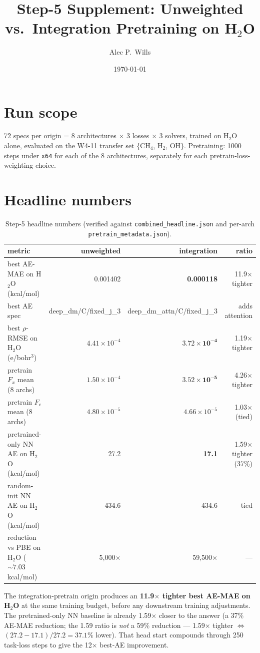 \documentclass[11pt,letterpaper]{article}
\title{Step-5 Supplement: Unweighted vs.\ Integration Pretraining on H$_2$O}
\author{Alec P.\ Wills}
\date{\today}
\begin{document}
\maketitle

\section*{Run scope}
72 specs per origin = 8 architectures $\times$ 3 losses $\times$ 3 solvers,
trained on H$_2$O alone, evaluated on the W4-11 transfer set
$\{$CH$_4$, H$_2$, OH$\}$. Pretraining: 1000 steps under \texttt{x64} for each
of the 8 architectures, separately for each pretrain-loss-weighting choice.

\section{Headline numbers}

\begin{table}[h]
\centering
\caption{Step-5 headline numbers (verified against
\texttt{combined\_headline.json} and per-arch \texttt{pretrain\_metadata.json}).}
\small
\begin{tabular}{lrrr}
\toprule
metric & unweighted & integration & ratio \\
\midrule
best AE-MAE on H$_2$O (kcal/mol) & 0.001402 & \textbf{0.000118} & 11.9$\times$ tighter \\
best AE spec & deep\_dm/C/fixed\_j\_3 & deep\_dm\_attn/C/fixed\_j\_3 & adds attention \\
best $\rho$-RMSE on H$_2$O (e/bohr$^3$) & $4.41\!\times\!10^{-4}$ & $\mathbf{3.72\!\times\!10^{-4}}$ & 1.19$\times$ tighter \\
pretrain $F_x$ mean (8 archs) & $1.50\!\times\!10^{-4}$ & $\mathbf{3.52\!\times\!10^{-5}}$ & 4.26$\times$ tighter \\
pretrain $F_c$ mean (8 archs) & $4.80\!\times\!10^{-5}$ & $4.66\!\times\!10^{-5}$ & 1.03$\times$ (tied) \\
pretrained-only NN AE on H$_2$O (kcal/mol) & 27.2 & \textbf{17.1} & 1.59$\times$ tighter (37\%) \\
random-init NN AE on H$_2$O (kcal/mol) & 434.6 & 434.6 & tied \\
reduction vs PBE on H$_2$O ($\sim 7.03$ kcal/mol) & 5,000$\times$ & 59,500$\times$ & --- \\
\bottomrule
\end{tabular}
\end{table}

\noindent
The integration-pretrain origin produces an \textbf{11.9$\times$ tighter best
AE-MAE on H$_2$O} at the same training budget, before any downstream training
adjustments. The pretrained-only NN baseline is already 1.59$\times$ closer to
the answer (a 37\% AE-MAE reduction; the 1.59 ratio is \emph{not} a 59\%
reduction --- 1.59$\times$ tighter $\Leftrightarrow$ $(27.2-17.1)/27.2 = 37.1\%$
lower). That head start compounds through 250 task-loss steps to give the
12$\times$ best-AE improvement.
\end{document}
